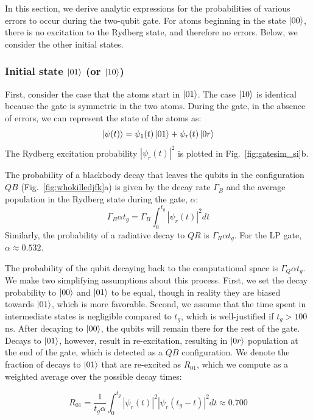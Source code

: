 \documentclass[%
reprint,
superscriptaddress,
 amsmath,amssymb,
 aps,
 prx,
floatfix,
]{revtex4-1}
\begin{document}
In this section, we derive analytic expressions for the probabilities of various errors to occur during the two-qubit gate. For atoms beginning in the state $\ket{00}$, there is no excitation to the Rydberg state, and therefore no errors. Below, we consider the other initial states.

\subsubsection{Initial state $\ket{01}$ (or $\ket{10}$)}

First, consider the case that the atoms start in $\ket{01}$. The case $\ket{10}$ is identical because the gate is symmetric in the two atoms. During the gate, in the absence of errors, we can represent the state of the atoms as:
\begin{equation}
    \ket{\psi(t)} = \psi_{1}(t)\ket{01} + \psi_r(t) \ket{0r}
\end{equation}
The Rydberg excitation probability $|\psi_r(t)|^2$ is plotted in Fig.~\ref{fig:gatesim_si}b.

The probability of a blackbody decay that leaves the qubits in the configuration $QB$ (Fig.~\ref{fig:whokilledjfk}a) is given by the decay rate $\Gamma_B$ and the average population in the Rydberg state during the gate, $\alpha$:
\begin{equation}
    \Gamma_B \alpha t_g  = \Gamma_B \int_0^{t_g} \left|\psi_r(t)\right|^2 dt
\end{equation}
Similarly, the probability of a radiative decay to $QR$ is $\Gamma_R \alpha t_g$. For the LP gate, $\alpha \approx 0.532$.

The probability of the qubit decaying back to the computational space is $\Gamma_Q \alpha t_g$. We make two simplifying assumptions about this process. First, we set the decay probability to $\ket{00}$ and $\ket{01}$ to be equal, though in reality they are biased towards $\ket{01}$, which is more favorable. Second, we assume that the time spent in intermediate states is negligible compared to $t_g$, which is well-justified if $t_g > 100$ ns. After decaying to $\ket{00}$, the qubits will remain there for the rest of the gate. Decays to $\ket{01}$, however, result in re-excitation, resulting in $\ket{0r}$ population at the end of the gate, which is detected as a $QB$ configuration. We denote the fraction of decays to $\ket{01}$ that are re-excited as $R_{01}$, which we compute as a weighted average over the possible decay times:

\begin{equation}
    R_{01} = \frac{1}{t_g \alpha} \int_0^{t_g} \left|\psi_r(t)\right|^2 \left|\psi_r(t_g-t)\right|^2 dt \approx 0.700
\end{equation}
\end{document}

